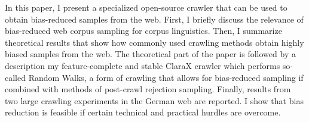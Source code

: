 In this paper, I present a specialized open-source crawler that can be used to obtain bias-reduced samples from the web. First, I briefly discuss the relevance of bias-reduced web corpus sampling for corpus linguistics. Then, I summarize theoretical results that show how commonly used crawling methods obtain highly biased samples from the web. The theoretical part of the paper is followed by a description my feature-complete and stable ClaraX crawler which performs so-called Random Walks, a form of crawling that allows for bias-reduced sampling if combined with methods of post-crawl rejection sampling. Finally, results from two large crawling experiments in the German web are reported. I show that bias reduction is feasible if certain technical and practical hurdles are overcome.

